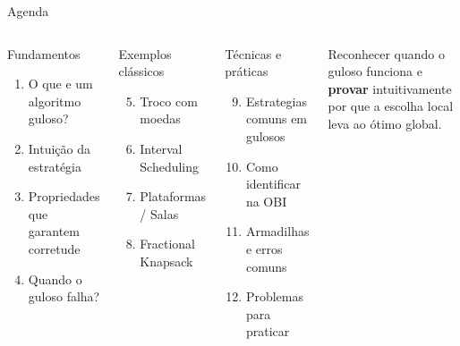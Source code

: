 \documentclass[aspectratio=169,10pt]{beamer}
\begin{document}
\begin{frame}{Agenda}
  \begin{columns}[t]
      \begin{block}{Fundamentos}
        \begin{enumerate}\footnotesize
          \item O que e um algoritmo guloso?
          \item Intuição da estratégia
          \item Propriedades que garantem corretude
          \item Quando o guloso falha?
        \end{enumerate}
      \end{block}
      \vspace{0.15cm}
      \begin{block}{Exemplos clássicos}
        \begin{enumerate}\setcounter{enumi}{4}\footnotesize
          \item Troco com moedas
          \item Interval Scheduling
          \item Plataformas / Salas
          \item Fractional Knapsack
        \end{enumerate}
      \end{block}
      \begin{block}{Técnicas e práticas}
        \begin{enumerate}\setcounter{enumi}{8}\footnotesize
          \item Estrategias comuns em gulosos
          \item Como identificar na OBI
          \item Armadilhas e erros comuns
          \item Problemas para praticar
        \end{enumerate}
      \end{block}
      \vspace{0.15cm}
      \begin{tcolorbox}[caixaDourada,title={Meta da aula}]
        \footnotesize
        Reconhecer quando o guloso funciona
        e \textbf{provar} intuitivamente por que
        a escolha local leva ao ótimo global.
      \end{tcolorbox}
  \end{columns}
\end{frame}
\end{document}
